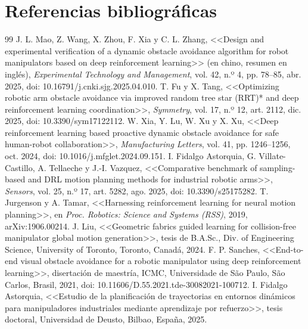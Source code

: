 \documentclass[11pt,a4paper,twoside]{article}
\begin{document}
\section{Referencias bibliográficas}
\makeatletter\let\origsection\section\def\section{\@ifstar\@gobble\origsection}\makeatother
\begin{thebibliography}{99}
\small
{} J. L. Mao, Z. Wang, X. Zhou, F. Xia y C. L. Zhang, <<Design and experimental verification of a dynamic obstacle avoidance algorithm for robot manipulators based on deep reinforcement learning>> (en chino, resumen en inglés), \emph{Experimental Technology and Management}, vol. 42, n.º 4, pp. 78--85, abr. 2025, doi: 10.16791/j.cnki.sjg.2025.04.010.
 T. Fu y X. Tang, <<Optimizing robotic arm obstacle avoidance via improved random tree star (RRT)* and deep reinforcement learning coordination>>, \emph{Symmetry}, vol. 17, n.º 12, art. 2112, dic. 2025, doi: 10.3390/sym17122112.
 W. Xia, Y. Lu, W. Xu y X. Xu, <<Deep reinforcement learning based proactive dynamic obstacle avoidance for safe human-robot collaboration>>, \emph{Manufacturing Letters}, vol. 41, pp. 1246--1256, oct. 2024, doi: 10.1016/j.mfglet.2024.09.151.
 I. Fidalgo Astorquia, G. Villate-Castillo, A. Tellaeche y J.-I. Vazquez, <<Comparative benchmark of sampling-based and DRL motion planning methods for industrial robotic arms>>, \emph{Sensors}, vol. 25, n.º 17, art. 5282, ago. 2025, doi: 10.3390/s25175282.
 T. Jurgenson y A. Tamar, <<Harnessing reinforcement learning for neural motion planning>>, en \emph{Proc. Robotics: Science and Systems (RSS)}, 2019, arXiv:1906.00214.
 J. Liu, <<Geometric fabrics guided learning for collision-free manipulator global motion generation>>, tesis de B.A.Sc., Div. of Engineering Science, University of Toronto, Toronto, Canadá, 2024.
 F. P. Sanches, <<End-to-end visual obstacle avoidance for a robotic manipulator using deep reinforcement learning>>, disertación de maestría, ICMC, Universidade de São Paulo, São Carlos, Brasil, 2021, doi: 10.11606/D.55.2021.tde-30082021-100712.
 I. Fidalgo Astorquia, <<Estudio de la planificación de trayectorias en entornos dinámicos para manipuladores industriales mediante aprendizaje por refuerzo>>, tesis doctoral, Universidad de Deusto, Bilbao, España, 2025.

\end{thebibliography}
\end{document}
